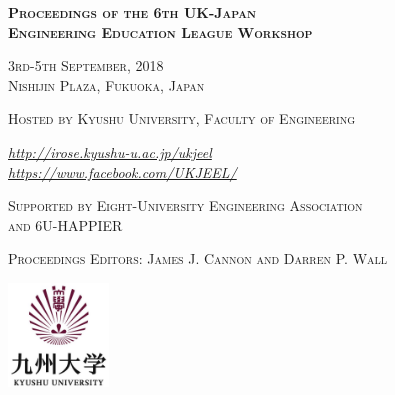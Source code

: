 \begin{titlepage}
\centering
	{\scshape\LARGE\bfseries Proceedings of the 6th  UK-Japan \\
              Engineering Education League Workshop \par}
	\vspace{1cm}
	{\scshape\Large 3rd-5th September, 2018\\
               Nishijin Plaza, Fukuoka, Japan \par}
	\vspace{1.5cm}
	{\scshape\large Hosted by Kyushu University, Faculty of Engineering \par}
	\vspace{1.5cm}
	{\large\itshape \url{http://irose.kyushu-u.ac.jp/ukjeel} \\
                \url{https://www.facebook.com/UKJEEL/}  \par}
	\vfill
	 
	{\scshape\large  Supported by Eight-University Engineering Association \\
          and 6U-HAPPIER \par }
\vspace{0.25cm}
{\scshape Proceedings Editors:  James J. Cannon  and Darren P. Wall \par }
\vspace{0.5cm}
\includegraphics[width=0.2\textwidth]{kyushu_log.jpg}\par\vspace{1cm}
\end{titlepage}

 
